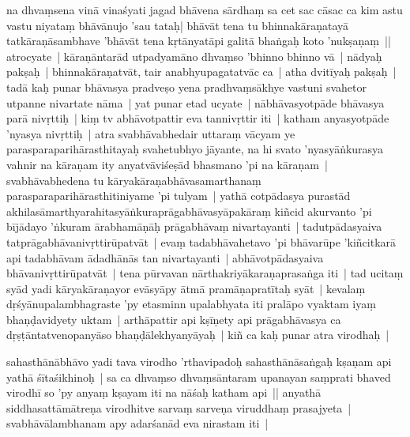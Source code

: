\documentclass[article,12pt,a4paper]{memoir}%
\newcounter{parCount}
\begin{document}
	  
	  \pstart \leavevmode%
	na dhvaṃsena vinā vinaśyati jagad bhāvena sārdhaṃ sa cet sac cāsac ca kim astu vastu niyataṃ bhāvānujo 'sau tataḥ| bhāvāt tena tu bhinnakāraṇatayā tatkāraṇāsambhave 'bhāvāt tena kṛtānyatāpi galitā bhaṅgaḥ koto 'nukṣaṇaṃ ||  \label{thakur75-120.22} atrocyate | kāraṇāntarād utpadyamāno dhvaṃso 'bhinno bhinno vā | \label{thakur75-120.22a} nādyaḥ pakṣaḥ | bhinnakāraṇatvāt, tair anabhyupagatatvāc ca | atha dvitīyaḥ pakṣaḥ | tadā kaḥ punar bhāvasya pradveṣo yena pradhvaṃsākhye vastuni svahetor utpanne nivartate nāma | \label{thakur75-120.25} yat punar etad ucyate | nābhāvasyotpāde bhāvasya parā nivṛttiḥ | kiṃ tv abhāvotpattir eva tannivṛttir iti | katham anyasyotpāde 'nyasya nivṛttiḥ | atra svabhāvabhedair uttaraṃ vācyam ye parasparaparihārasthitayaḥ svahetubhyo jāyante, na hi svato 'nyasyāṅkurasya vahnir na kāraṇam ity anyatvāviśeṣād bhasmano 'pi na kāraṇam | svabhāvabhedena tu kāryakāraṇabhāvasamarthanaṃ parasparaparihārasthitiniyame 'pi tulyam | yathā cotpādasya purastād akhilasāmarthyarahitasyāṅkuraprāgabhāvasyāpakāraṃ kiñcid akurvanto 'pi bījādayo 'ṅkuram ārabhamāṇāḥ prāgabhāvaṃ nivartayanti | tadutpādasyaiva tatprāgabhāvanivṛttirūpatvāt | evaṃ tadabhāvahetavo 'pi bhāvarūpe 'kiñcitkarā api tadabhāvam ādadhānās tan nivartayanti | abhāvotpādasyaiva bhāvanivṛttirūpatvāt | tena pūrvavan nārthakriyākaraṇaprasaṅga iti | \label{thakur75-121.2} tad ucitaṃ syād yadi kāryakāraṇayor evāsyāpy ātmā pramāṇapratītaḥ syāt | kevalaṃ dṛśyānupalambhagraste 'py etasminn upalabhyata iti pralāpo vyaktam iyaṃ bhaṇḍavidyety uktam | \label{thakur75-121.4} arthāpattir api kṣīṇety api prāgabhāvasya ca dṛṣṭāntatvenopanyāso bhaṇḍālekhyanyāyaḥ | \label{thakur75-121.6} kiñ ca kaḥ punar atra virodhaḥ |
	{}
	\pend%
      

	  
	  \pstart \leavevmode%
	sahasthānābhāvo yadi tava virodho 'rthavipadoḥ sahasthānāsaṅgaḥ kṣaṇam api yathā śītaśikhinoḥ | sa ca dhvaṃso dhvaṃsāntaram upanayan saṃprati bhaved virodhī so 'py anyaṃ kṣayam iti na nāśaḥ katham api ||  \label{thakur75-121.11} anyathā siddhasattāmātreṇa virodhitve sarvaṃ sarveṇa viruddhaṃ prasajyeta | svabhāvālambhanam apy adarśanād eva nirastam iti |
	{}
	\pend%
      
\end{document}
